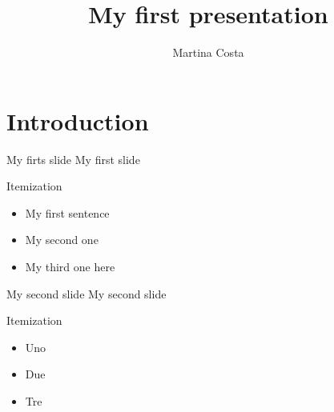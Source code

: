 \documentclass{beamer} %
\title{My first presentation}
\author{Martina Costa}
\begin{document}
\maketitle


\section{Introduction}

\begin{frame}{My firts slide}
    My first slide
\end{frame}

\begin{frame}{Itemization}
    \begin{itemize}
        \item My first sentence
        \item \pause My second one %
        \item \pause My third one here
    \end{itemize}
\end{frame}

\begin{frame}{My second slide}
    My second slide
\end{frame}

\begin{frame}{Itemization}
    \begin{itemize}
        \item \scriptsize {Uno} %
        \item \large {Due} %
        \item Tre
    \end{itemize}
\end{frame}
\end{document}
